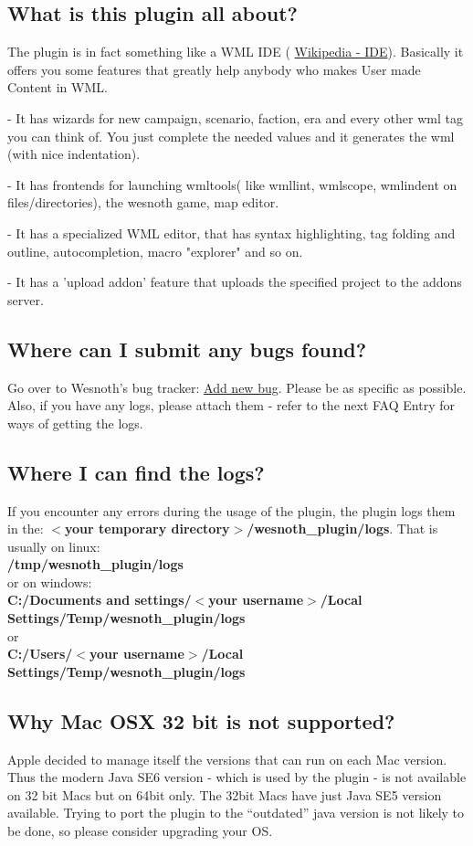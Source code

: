 \documentclass[10pt]{article}
\begin{document}
\subsection{What is this plugin all about?}
The plugin is in fact something like a WML IDE ( \href{http://en.wikipedia.org/wiki/Integrated_development_environment}{Wikipedia - IDE}). Basically it offers you some features that greatly help anybody who makes User made Content in WML.
\begin{description}
\item- It has wizards for new campaign, scenario, faction, era and every other wml tag you can think of. You just complete the needed values and it generates the wml (with nice indentation).
\item- It has frontends for launching wmltools( like wmllint, wmlscope, wmlindent on files/directories), the wesnoth game, map editor.
\item- It has a specialized WML editor, that has syntax highlighting, tag folding and outline, autocompletion, macro "explorer" and so on.
\item- It has a 'upload addon' feature that uploads the specified project to the addons server.
\end{description}

\subsection{Where can I submit any bugs found?}
Go over to Wesnoth's bug tracker: \href{https://gna.org/bugs/?func=additem&group=wesnoth&bug_group_id=116}{Add new bug}. Please be as specific as possible. Also, if you have any logs, please attach them - refer to the next FAQ Entry for ways of getting the logs.

\subsection{Where I can find the logs?}
If you encounter any errors during the usage of the plugin, the plugin logs them in the: \textbf{$<$your temporary directory$>$/wesnoth\_plugin/logs}.
That is usually on linux:\\
\indent \textbf{/tmp/wesnoth\_plugin/logs}\\
or on windows:\\
\indent \textbf{C:/Documents and settings/$<$your username$>$/Local Settings/Temp/wesnoth\_plugin/logs} \\
or\\
\indent \textbf{C:/Users/$<$your username$>$/Local Settings/Temp/wesnoth\_plugin/logs}

\subsection{Why Mac OSX 32 bit is not supported?}
Apple decided to manage itself the versions that can run on each Mac version. Thus the modern Java SE6 version - which is used by the plugin - is not available on 32 bit Macs but on 64bit only. The 32bit Macs have just Java SE5 version available. Trying to port the plugin to the ``outdated'' java version is not likely to be done, so please consider upgrading your OS.
\end{document}
